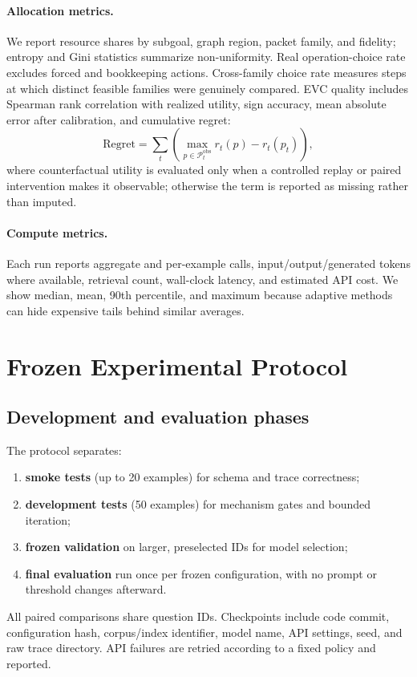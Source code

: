 \paragraph{Allocation metrics.}
We report resource shares by subgoal, graph region, packet family, and fidelity; entropy and Gini statistics summarize non-uniformity. Real operation-choice rate excludes forced and bookkeeping actions. Cross-family choice rate measures steps at which distinct feasible families were genuinely compared. EVC quality includes Spearman rank correlation with realized utility, sign accuracy, mean absolute error after calibration, and cumulative regret:
\begin{equation}
\mathrm{Regret}=\sum_t\left(\max_{p\in\mathcal{P}_t^{\mathrm{obs}}} r_t(p)-r_t(p_t)\right),
\end{equation}
where counterfactual utility is evaluated only when a controlled replay or paired intervention makes it observable; otherwise the term is reported as missing rather than imputed.

\paragraph{Compute metrics.}
Each run reports aggregate and per-example calls, input/output/generated tokens where available, retrieval count, wall-clock latency, and estimated API cost. We show median, mean, 90th percentile, and maximum because adaptive methods can hide expensive tails behind similar averages.

\section{Frozen Experimental Protocol}

\subsection{Development and evaluation phases}

The protocol separates:
\begin{enumerate}[leftmargin=*]
  \item \textbf{smoke tests} (up to 20 examples) for schema and trace correctness;
  \item \textbf{development tests} (50 examples) for mechanism gates and bounded iteration;
  \item \textbf{frozen validation} on larger, preselected IDs for model selection;
  \item \textbf{final evaluation} run once per frozen configuration, with no prompt or threshold changes afterward.
\end{enumerate}
All paired comparisons share question IDs. Checkpoints include code commit, configuration hash, corpus/index identifier, model name, API settings, seed, and raw trace directory. API failures are retried according to a fixed policy and reported.

